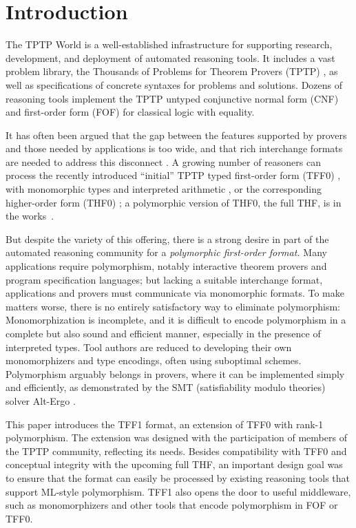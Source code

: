 \section{Introduction}
\label{sec_intro}

The TPTP World \cite{sutcliffe-2010-world} is a well-established infrastructure
for supporting research, development, and deployment of automated reasoning
tools. It includes a vast problem library, the Thousands of Problems for Theorem
Provers (TPTP) \cite{sutcliffe-2009-lib}, as well as specifications of concrete
syntaxes for problems and solutions.
Dozens of reasoning tools implement the TPTP untyped conjunctive normal form
(CNF) and first-order form (FOF) for classical logic with equality.

It has often been argued that the gap between the features supported by provers
and those needed by applications is too wide, and that rich interchange formats
are needed to address this disconnect
\cite{schumann-2001,voronkov-2003,mccune-2003,stickel-2009,kuncak-2011}.
A growing number of reasoners can process the
recently introduced ``initial'' TPTP typed first-order form (TFF0) \cite{sutcliffe-et-al-2012-tff0},
with monomorphic types and interpreted arithmetic \cite{SPASS-T,vampire-arith},
or the corresponding higher-order form (THF0) \cite{benzmueller-et-al-2008-thf0};
a polymorphic version of THF0, the full THF, is in the works~\cite{sutcliffe-benzmueller-2010}.

But despite the variety of this offering, there is a strong desire in part of the automated
reasoning community for a \emph{polymorphic first-order format.} Many applications
require polymorphism, notably interactive theorem provers and program
specification languages; but lacking a suitable interchange format, applications
and provers must communicate via monomorphic formats. To make matters worse, there is no entirely
satisfactory way to eliminate polymorphism: Monomorphization is %
incomplete, and it is difficult to encode polymorphism in a complete but
also sound and efficient manner, especially in the presence of interpreted types. Tool authors
are reduced to developing their own monomorphizers and type encodings, often
using suboptimal schemes. Polymorphism arguably belongs in
provers, where it can be implemented simply and efficiently, as demonstrated by
the SMT (satisfiability modulo theories) solver Alt-Ergo \cite{bobot-et-al-2008}.

This paper introduces the TFF1
format, an extension of TFF0 with rank-1 polymorphism. The
extension was designed with the participation of members of the TPTP community,
reflecting its needs.
Besides compatibility with TFF0 and conceptual integrity with the upcoming full
THF, an important design goal was to ensure that the format can easily be
processed by existing reasoning tools that support ML-style polymorphism. TFF1
also opens the door to useful middleware, such as monomorphizers and other
tools that encode polymorphism in FOF or TFF0.

